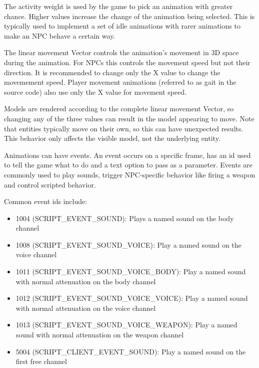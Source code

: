\documentclass[10pt, a4paper, titlepage, oneside]{article}
\begin{document}
\vspace{\baselineskip}
The activity weight is used by the game to pick an animation with greater chance. Higher values increase the change of the animation being selected. This is typically used to implement a set of idle animations with rarer animations to make an NPC behave a certain way.

\vspace{\baselineskip}
The linear movement Vector controls the animation's movement in 3D space during the animation. For NPCs this controls the movement speed but not their direction. It is recommended to change only the X value to change the movemement speed. Player movement animations (referred to as gait in the source code) also use only the X value for movement speed.

\vspace{\baselineskip}
Models are rendered according to the complete linear movement Vector, so changing any of the three values can result in the model appearing to move. Note that entities typically move on their own, so this can have unexpected results. This behavior only affects the visible model, not the underlying entity.

\vspace{\baselineskip}
Animations can have events. An event occurs on a specific frame, has an id used to tell the game what to do and a text option to pass as a parameter.
Events are commonly used to play sounds, trigger NPC-specific behavior like firing a weapon and control scripted behavior.

\vspace{\baselineskip}
Common event ids include:
\begin{itemize}
\item 1004 (SCRIPT\_EVENT\_SOUND): Plays a named sound on the body channel
\item 1008 (SCRIPT\_EVENT\_SOUND\_VOICE): Play a named sound on the voice channel
\item 1011 (SCRIPT\_EVENT\_SOUND\_VOICE\_BODY): Play a named sound with normal attenuation on the body channel
\item 1012 (SCRIPT\_EVENT\_SOUND\_VOICE\_VOICE): Play a named sound with normal attenuation on the voice channel
\item 1013 (SCRIPT\_EVENT\_SOUND\_VOICE\_WEAPON): Play a named sound with normal attenuation on the weapon channel
\item 5004 (SCRIPT\_CLIENT\_EVENT\_SOUND): Play a named sound on the first free channel
\end{itemize}
\end{document}
